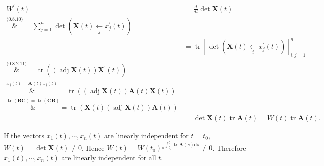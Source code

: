 \documentclass[12pt]{homework}
\begin{document}
\begin{solution}
    \begin{align*}
        W^\prime (t) &= \frac{d}{dt} \det \mathbf{X}(t) \\
        \overset{\text{(0.8.10)}}&{=} \sum_{j=1}^{n} \operatorname{det}\left(\mathbf{X}(t) \xleftarrow[j]{} x_{j}^{\prime}(t)\right) \\
        &= \operatorname{tr}\left[\operatorname{det}\left(\mathbf{X}(t) \xleftarrow[i]{} x_{j}^{\prime}(t)\right)\right]_{i, j=1}^{n} \\
        \overset{\text{(0.8.2.11)}}&{=} \operatorname{tr}\left((\operatorname{adj} \mathbf{X}(t)) \mathbf{X}^{\prime}(t)\right) \\
        \overset{x^\prime _j (t) = \mathbf{A}(t) x _j (t)}&{=} \operatorname{tr}((\operatorname{adj} \mathbf{X}(t)) \mathbf{A}(t) \mathbf{X}(t)) \\
        \overset{\operatorname{tr} (\mathbf{B}\mathbf{C})  = \operatorname{tr} (\mathbf{C}\mathbf{B})}&{=}  \operatorname{tr}( \mathbf{X}(t) (\operatorname{adj} \mathbf{X}(t)) \mathbf{A}(t))\\
        &= \det \mathbf{X}(t) \operatorname{tr}  \mathbf{A}(t) = W(t) \operatorname{tr} \mathbf{A}(t).
    \end{align*}

    If the vectors $x_1(t) , \cdots, x_n(t)$ are linearly independent for $t=t_0$, $W(t) = \det \mathbf{X}(t) \neq 0$.
    Hence $W(t)=W\left(t_{0}\right) e^{\int_{t_{0}}^{t} \operatorname{tr} \mathbf{A}(s) \mathrm{d} s} \neq 0$.
    Therefore $x_1(t) , \cdots, x_n(t)$ are linearly independent for all $t$.
\end{solution}
\end{document}
